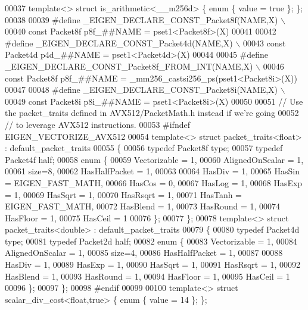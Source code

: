\begin{DoxyCode}
00037 \textcolor{keyword}{template}<> \textcolor{keyword}{struct }is\_arithmetic<\_\_m256d> \{ \textcolor{keyword}{enum} \{ value = \textcolor{keyword}{true} \}; \};
00038 
00039 \textcolor{preprocessor}{#define \_EIGEN\_DECLARE\_CONST\_Packet8f(NAME,X) \(\backslash\)}
00040 \textcolor{preprocessor}{  const Packet8f p8f\_##NAME = pset1<Packet8f>(X)}
00041 
00042 \textcolor{preprocessor}{#define \_EIGEN\_DECLARE\_CONST\_Packet4d(NAME,X) \(\backslash\)}
00043 \textcolor{preprocessor}{  const Packet4d p4d\_##NAME = pset1<Packet4d>(X)}
00044 
00045 \textcolor{preprocessor}{#define \_EIGEN\_DECLARE\_CONST\_Packet8f\_FROM\_INT(NAME,X) \(\backslash\)}
00046 \textcolor{preprocessor}{  const Packet8f p8f\_##NAME = \_mm256\_castsi256\_ps(pset1<Packet8i>(X))}
00047 
00048 \textcolor{preprocessor}{#define \_EIGEN\_DECLARE\_CONST\_Packet8i(NAME,X) \(\backslash\)}
00049 \textcolor{preprocessor}{  const Packet8i p8i\_##NAME = pset1<Packet8i>(X)}
00050 
00051 \textcolor{comment}{// Use the packet\_traits defined in AVX512/PacketMath.h instead if we're going}
00052 \textcolor{comment}{// to leverage AVX512 instructions.}
00053 \textcolor{preprocessor}{#ifndef EIGEN\_VECTORIZE\_AVX512}
00054 \textcolor{keyword}{template}<> \textcolor{keyword}{struct }packet\_traits<float>  : default\_packet\_traits
00055 \{
00056   \textcolor{keyword}{typedef} Packet8f type;
00057   \textcolor{keyword}{typedef} Packet4f half;
00058   \textcolor{keyword}{enum} \{
00059     Vectorizable = 1,
00060     AlignedOnScalar = 1,
00061     size=8,
00062     HasHalfPacket = 1,
00063 
00064     HasDiv  = 1,
00065     HasSin  = EIGEN\_FAST\_MATH,
00066     HasCos  = 0,
00067     HasLog  = 1,
00068     HasExp  = 1,
00069     HasSqrt = 1,
00070     HasRsqrt = 1,
00071     HasTanh  = EIGEN\_FAST\_MATH,
00072     HasBlend = 1,
00073     HasRound = 1,
00074     HasFloor = 1,
00075     HasCeil = 1
00076   \};
00077 \};
00078 \textcolor{keyword}{template}<> \textcolor{keyword}{struct }packet\_traits<double> : default\_packet\_traits
00079 \{
00080   \textcolor{keyword}{typedef} Packet4d type;
00081   \textcolor{keyword}{typedef} Packet2d half;
00082   \textcolor{keyword}{enum} \{
00083     Vectorizable = 1,
00084     AlignedOnScalar = 1,
00085     size=4,
00086     HasHalfPacket = 1,
00087 
00088     HasDiv  = 1,
00089     HasExp  = 1,
00090     HasSqrt = 1,
00091     HasRsqrt = 1,
00092     HasBlend = 1,
00093     HasRound = 1,
00094     HasFloor = 1,
00095     HasCeil = 1
00096   \};
00097 \};
00098 \textcolor{preprocessor}{#endif}
00099 
00100 \textcolor{keyword}{template}<> \textcolor{keyword}{struct }scalar\_div\_cost<float,true> \{ \textcolor{keyword}{enum} \{ value = 14 \}; \};

\end{DoxyCode}

